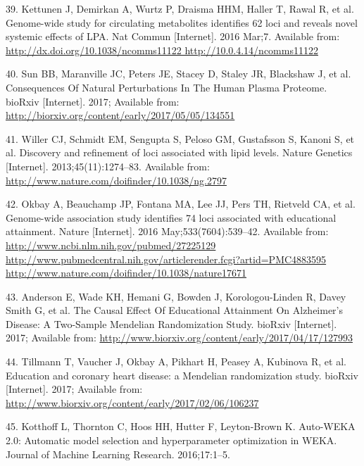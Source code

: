 \documentclass[]{article}
\begin{document}
\hypertarget{ref-Kettunen2016}{}
39. Kettunen J, Demirkan A, Wurtz P, Draisma HHM, Haller T, Rawal R, et
al. Genome-wide study for circulating metabolites identifies 62 loci and
reveals novel systemic effects of LPA. Nat Commun {[}Internet{]}. 2016
Mar;7. Available from:
\href{http://dx.doi.org/10.1038/ncomms11122\%20http://10.0.4.14/ncomms11122}{http://dx.doi.org/10.1038/ncomms11122 http://10.0.4.14/ncomms11122}

\hypertarget{ref-Sun2017}{}
40. Sun BB, Maranville JC, Peters JE, Stacey D, Staley JR, Blackshaw J,
et al. Consequences Of Natural Perturbations In The Human Plasma
Proteome. bioRxiv {[}Internet{]}. 2017; Available from:
\url{http://biorxiv.org/content/early/2017/05/05/134551}

\hypertarget{ref-Willer2013}{}
41. Willer CJ, Schmidt EM, Sengupta S, Peloso GM, Gustafsson S, Kanoni
S, et al. Discovery and refinement of loci associated with lipid levels.
Nature Genetics {[}Internet{]}. 2013;45(11):1274--83. Available from:
\url{http://www.nature.com/doifinder/10.1038/ng.2797}

\hypertarget{ref-Okbay2016}{}
42. Okbay A, Beauchamp JP, Fontana MA, Lee JJ, Pers TH, Rietveld CA, et
al. Genome-wide association study identifies 74 loci associated with
educational attainment. Nature {[}Internet{]}. 2016
May;533(7604):539--42. Available from:
\href{http://www.ncbi.nlm.nih.gov/pubmed/27225129\%20http://www.pubmedcentral.nih.gov/articlerender.fcgi?artid=PMC4883595\%20http://www.nature.com/doifinder/10.1038/nature17671}{http://www.ncbi.nlm.nih.gov/pubmed/27225129 http://www.pubmedcentral.nih.gov/articlerender.fcgi?artid=PMC4883595 http://www.nature.com/doifinder/10.1038/nature17671}

\hypertarget{ref-Anderson2017}{}
43. Anderson E, Wade KH, Hemani G, Bowden J, Korologou-Linden R, Davey
Smith G, et al. The Causal Effect Of Educational Attainment On
Alzheimer's Disease: A Two-Sample Mendelian Randomization Study. bioRxiv
{[}Internet{]}. 2017; Available from:
\url{http://www.biorxiv.org/content/early/2017/04/17/127993}

\hypertarget{ref-Tillmann2017}{}
44. Tillmann T, Vaucher J, Okbay A, Pikhart H, Peasey A, Kubinova R, et
al. Education and coronary heart disease: a Mendelian randomization
study. bioRxiv {[}Internet{]}. 2017; Available from:
\url{http://www.biorxiv.org/content/early/2017/02/06/106237}

\hypertarget{ref-kotthoff2016auto}{}
45. Kotthoff L, Thornton C, Hoos HH, Hutter F, Leyton-Brown K. Auto-WEKA
2.0: Automatic model selection and hyperparameter optimization in WEKA.
Journal of Machine Learning Research. 2016;17:1--5.
\end{document}
